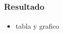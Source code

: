 \frame
{
\frametitle{Resultado}
\framesubtitle{}
\begin{itemize}
	\item tabla y grafico
\end{itemize}
}
